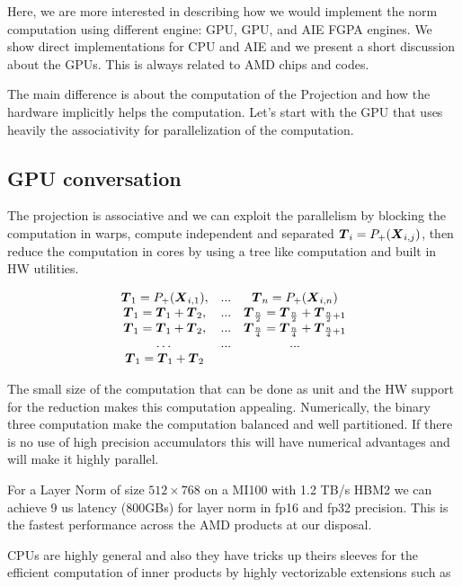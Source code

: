 \documentclass[acmsmall]{acmart}
\begin{document}
Here, we are more interested in describing how we would implement the
norm computation using different engine: GPU, GPU, and AIE FGPA
engines. We show direct implementations for CPU and AIE and we present
a short discussion about the GPUs. This is always related to AMD chips
and codes.

The main difference is about the computation of the Projection and how
the hardware implicitly helps the computation. Let's start with the
GPU that uses heavily the associativity for parallelization of the
computation.

\subsection{GPU conversation}
The projection is associative and we can exploit the parallelism by
blocking the computation in warps, compute independent and separated
${\boldsymbol T}_i = P_+({\boldsymbol X}_{i,j})$, then reduce the computation in cores
by using a tree like computation and built in HW utilities.

\begin{equation}
  \begin{matrix}
    {\boldsymbol T}_1 = P_+({\boldsymbol X}_{i,1}), & ... &  {\boldsymbol T}_n = P_+({\boldsymbol X}_{i,n}) \\ 
    {\boldsymbol T}_1 = {\boldsymbol T}_1+{\boldsymbol T}_2, & ... &  {\boldsymbol T}_{\frac{n}{2}} = {\boldsymbol T}_{\frac{n}{2}} + {\boldsymbol T}_{\frac{n}{2}+1} \\
    {\boldsymbol T}_1 = {\boldsymbol T}_1 + {\boldsymbol T}_2, & ... &  {\boldsymbol T}_{\frac{n}{4}} = {\boldsymbol T}_{\frac{n}{4}} + {\boldsymbol T}_{\frac{n}{4}+1} \\
    \dots  & ... & ... \\ 
    {\boldsymbol T}_1 = {\boldsymbol T}_1 + {\boldsymbol T}_2 & & \\
  \end{matrix}
\end{equation}

The small size of the computation that can be done as unit and the HW
support for the reduction makes this computation
appealing. Numerically, the binary three computation make the
computation balanced and well partitioned. If there is no use of high
precision accumulators this will have numerical advantages and will
make it highly parallel.

For a Layer Norm of size $512 \times 768$ on a MI100 with 1.2 TB/s
HBM2 we can achieve 9 us latency (800GBs) for layer norm in fp16 and
fp32 precision. This is the fastest performance across the AMD
products at our disposal.

CPUs are highly general and also they have tricks up theirs sleeves
for the efficient computation of inner products by highly vectorizable
extensions such as 
\end{document}
